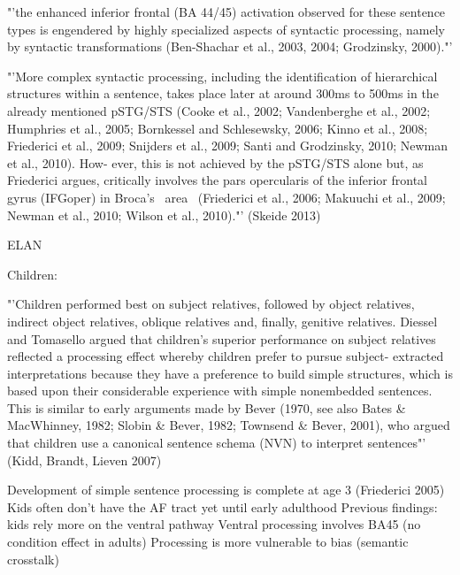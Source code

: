 "'the enhanced inferior frontal (BA 44/45) activation observed for these sentence types is engendered by highly specialized aspects of syntactic processing, namely by syntactic transformations (Ben-Shachar et al., 2003, 2004; Grodzinsky, 2000)."'

 "'More complex syntactic processing, 
 including the identification of hierarchical structures within a sentence, takes 
 place later at around 300ms to 500ms in the already mentioned pSTG/STS 
 (Cooke et al., 2002; Vandenberghe et al., 2002; Humphries et al., 2005; 
 Bornkessel and Schlesewsky, 2006; Kinno et al., 2008; Friederici et al., 2009; 
 Snijders et al., 2009; Santi and Grodzinsky, 2010; Newman et al., 2010). How-
 ever, this is not achieved by the pSTG/STS alone but, as Friederici argues, 
 critically involves the pars opercularis of the inferior frontal gyrus (IFGoper) in 
 Broca’s  area  (Friederici et al., 2006; Makuuchi et al., 2009; Newman et al., 
 2010; Wilson et al., 2010)."' (Skeide 2013)

 ELAN

Children:

"'Children
 performed best on subject relatives, followed by object relatives, indirect
 object relatives, oblique relatives and, finally, genitive relatives. Diessel and
 Tomasello argued that children’s superior performance on subject relatives
 reflected a processing effect whereby children prefer to pursue subject-
 extracted interpretations because they have a preference to build simple
 structures, which is based upon their considerable experience with simple
 nonembedded sentences. This is similar to early arguments made by Bever
 (1970, see also Bates \& MacWhinney, 1982; Slobin \& Bever, 1982; Townsend
 \& Bever, 2001), who argued that children use a canonical sentence schema
 (NVN) to interpret sentences"' (Kidd, Brandt, Lieven 2007)

Development of simple sentence processing is complete at age 3 (Friederici 2005)
Kids often don't have the AF tract yet until early adulthood
Previous findings: kids rely more on the ventral pathway
Ventral processing involves BA45 (no condition effect in adults)
Processing is more vulnerable to bias (semantic crosstalk)

